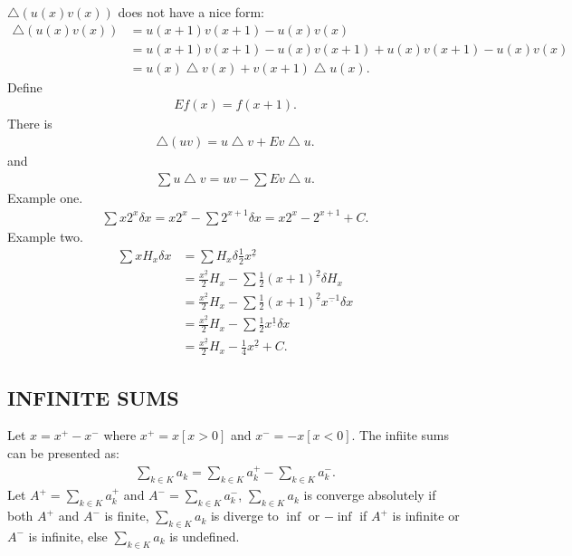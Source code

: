 \documentclass{article}
\begin{document}
$\bigtriangleup (u(x)v(x))$ does not have a nice form:
\begin{align}
\bigtriangleup(u(x)v(x)) &= u(x+1)v(x+1) - u(x)v(x) \\
			 &= u(x+1)v(x+1) - u(x)v(x+1) + u(x)v(x+1) - u(x)v(x)\\
			 &= u(x)\bigtriangleup v(x) + v(x+1)\bigtriangleup u(x).
\end{align}
Define 
\begin{align}
Ef(x) = f(x+1).
\end{align}
There is
\begin{align}
\bigtriangleup (uv) = u\bigtriangleup v + Ev\bigtriangleup u.
\end{align}
and 
\begin{align}
\sum u \bigtriangleup v = uv - \sum Ev \bigtriangleup u.
\end{align}
Example one.
\begin{align}
\sum x2^x \delta x = x2^x - \sum 2^{x+1} \delta x = x2^x - 2^{x+1} + C.
\end{align}
Example two.
\begin{align}
\sum xH_x \delta x &= \sum H_x \delta \frac{1}{2}x^{\underline 2} \\
		   &= \frac{x^{\underline 2}}{2}H_x - \sum \frac{1}{2}(x+1)^{\underline 2}\delta H_x \\
		   &= \frac{x^{\underline 2}}{2}H_x - \sum \frac{1}{2}(x+1)^{\underline 2}x^{\underline -1}\delta x \\
		   &= \frac{x^{\underline 2}}{2}H_x - \sum \frac{1}{2}x^{\underline 1} \delta x \\
		   &= \frac{x^{\underline 2}}{2}H_x - \frac{1}{4}x^{\underline 2} + C.
\end{align}

\subsection{INFINITE SUMS}
Let $x = x^+ - x^-$ where $x^+ = x[x > 0]$ and $x^- = -x[x<0]$.
The infiite sums can be presented as:
\begin{align}
\sum_{k \in K} a_k = \sum_{k \in K} a_k^+ - \sum_{k \in K} a_k^-.
\end{align}
Let $A^+ = \sum_{k \in K} a_k^+$ and $A^- = \sum_{k \in K} a_k^-$, $\sum_{k \in K}a_k$ is converge absolutely if both $A^+$ and $A^-$ is finite, $\sum_{k \in K}a_k$ is diverge to $\inf$ or $-\inf$ if $A^+$ is infinite or $A^-$ is infinite, else $\sum_{k \in K}a_k$ is undefined.
\end{document}
